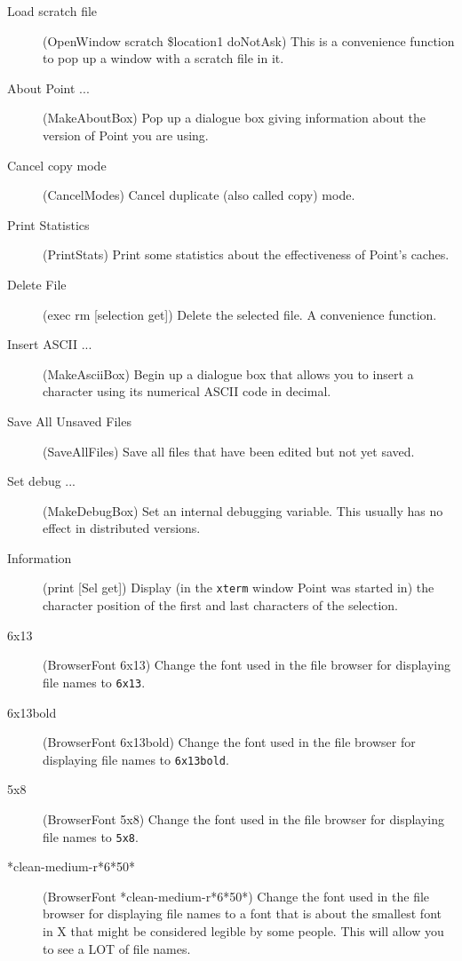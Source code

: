 \begin{description}
\begin{description}
	\item[Load scratch file] (OpenWindow scratch \$location1 doNotAsk)
	This is a convenience function to pop up a window with a scratch
	file in it.

	\item[About Point ...] (MakeAboutBox)
	Pop up a dialogue box giving information about
	the version of Point you are using.

	\item[Cancel copy mode] (CancelModes)
	Cancel duplicate (also called copy) mode.

	\item[Print Statistics] (PrintStats)
	Print some statistics about the effectiveness of Point's caches.

	\item[Delete File] (exec rm [selection get])
	Delete the selected file.  A convenience function.

	\item[Insert ASCII ...] (MakeAsciiBox)
	Begin up a dialogue box that allows you to insert
	a character using its numerical ASCII code in decimal.

	\item[Save All Unsaved Files] (SaveAllFiles)
	Save all files that have been edited but not yet saved.

	\item[Set debug ...] (MakeDebugBox)
	Set an internal debugging variable.
	This usually has no effect in distributed versions.

	\item[Information] (print [Sel get])
	Display (in the {\tt xterm} window Point was started in)
	the character position
	of the first and last characters of the selection.

	\item[6x13] (BrowserFont 6x13)
	Change the font used in the file browser for displaying
	file names to {\tt 6x13}.

	\item[6x13bold] (BrowserFont 6x13bold)
	Change the font used in the file browser for displaying
	file names to {\tt 6x13bold}.

	\item[5x8] (BrowserFont 5x8)
	Change the font used in the file browser for displaying
	file names to {\tt 5x8}.

	\item[*clean-medium-r*6*50*] (BrowserFont *clean-medium-r*6*50*)
	Change the font used in the file browser for displaying
	file names to a font that is about the smallest font in
	X that might be considered legible by some people.
	This will allow you to see a LOT of file names.


\end{description}
\end{description}
